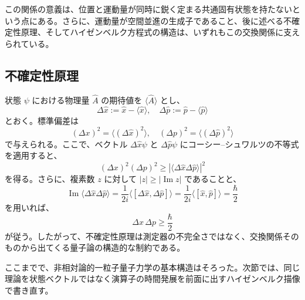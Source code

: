 この関係の意義は、位置と運動量が同時に鋭く定まる共通固有状態を持たないという点にある。さらに、運動量が空間並進の生成子であること、後に述べる不確定性原理、そしてハイゼンベルク方程式の構造は、いずれもこの交換関係に支えられている。

\subsection{不確定性原理}
状態 $\psi$ における物理量 $\hat{A}$ の期待値を $\langle \hat{A} \rangle$ とし、
\[
\Delta \hat{x} := \hat{x} - \langle \hat{x} \rangle, \quad \Delta \hat{p} := \hat{p} - \langle \hat{p} \rangle
\]
とおく。標準偏差は
\[
(\Delta x)^2 = \langle (\Delta \hat{x})^2 \rangle, \quad (\Delta p)^2 = \langle (\Delta \hat{p})^2 \rangle
\]
で与えられる。ここで、ベクトル $\Delta \hat{x}\psi$ と $\Delta \hat{p}\psi$ にコーシー--シュワルツの不等式を適用すると、
\[
(\Delta x)^2(\Delta p)^2 \ge \left| \langle \Delta \hat{x}\Delta \hat{p} \rangle \right|^2
\]
を得る。さらに、複素数 $z$ に対して $|z| \ge |\operatorname{Im} z|$ であることと、
\[
\operatorname{Im}\langle \Delta \hat{x}\Delta \hat{p} \rangle
= \frac{1}{2i}\langle [\Delta \hat{x}, \Delta \hat{p}] \rangle
= \frac{1}{2i}\langle [\hat{x}, \hat{p}] \rangle
= \frac{\hbar}{2}
\]
を用いれば、
\[
\Delta x \, \Delta p \ge \frac{\hbar}{2}
\]
が従う。したがって、不確定性原理は測定器の不完全さではなく、交換関係そのものから出てくる量子論の構造的な制約である。

ここまでで、非相対論的一粒子量子力学の基本構造はそろった。次節では、同じ理論を状態ベクトルではなく演算子の時間発展を前面に出すハイゼンベルク描像で書き直す。
